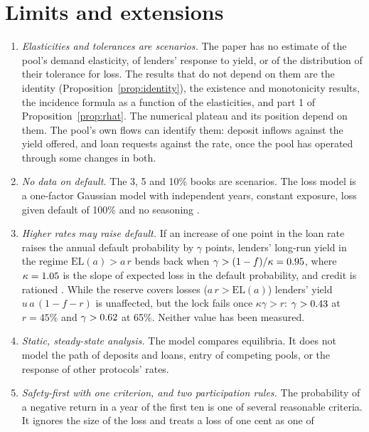 \documentclass[preprint,11pt,authoryear]{elsarticle}
\theoremstyle{definition}
\newcommand{\EL}{\mathrm{EL}}
\begin{document}
\section{Limits and extensions}\label{sec:limits}

\begin{enumerate}
\item \emph{Elasticities and tolerances are scenarios.} The paper has no estimate of the pool's demand elasticity, of lenders'
  response to yield, or of the distribution of their tolerance for loss. The results that do not depend on them are the identity
  (Proposition~\ref{prop:identity}), the existence and monotonicity results, the incidence formula as a function of the
  elasticities, and part 1 of Proposition~\ref{prop:rhat}. The numerical plateau and its position depend on them. The
  pool's own flows can identify them: deposit inflows against the yield offered, and loan requests against the rate, once the pool has
  operated through some changes in both.
\item \emph{No data on default.} The 3, 5 and 10\% books are scenarios. The loss model is a one-factor Gaussian model with
  independent years, constant exposure, loss given default of 100\% and no seasoning \citep{vasicek2002,pricingreserve2026}.
\item \emph{Higher rates may raise default.} If an increase of one point in the loan rate raises the annual default probability by $\gamma$
  points, lenders' long-run yield in the regime $\EL(a)>a\,r$ bends back when $\gamma>(1-f)/\kappa=0.95$, where $\kappa=1.05$ is the
  slope of expected loss in the default probability, and credit is rationed \citep{stiglitz1981}. While the reserve covers
  losses ($a\,r>\EL(a)$) lenders' yield $u\,a\,(1-f-r)$ is unaffected, but the lock fails once $\kappa\gamma>r$: $\gamma>0.43$ at $r=45\%$ and $\gamma>0.62$ at 65\%. Neither value has been measured.
\item \emph{Static, steady-state analysis.} The model compares equilibria. It does not model the path of deposits and loans, entry of
  competing pools, or the response of other protocols' rates.
\item \emph{Safety-first with one criterion, and two participation rules.} The probability of a negative return in a year of
  the first ten is one of several reasonable criteria. It ignores the size of the loss and treats a loss of one cent as one of

\end{enumerate}
\end{document}
